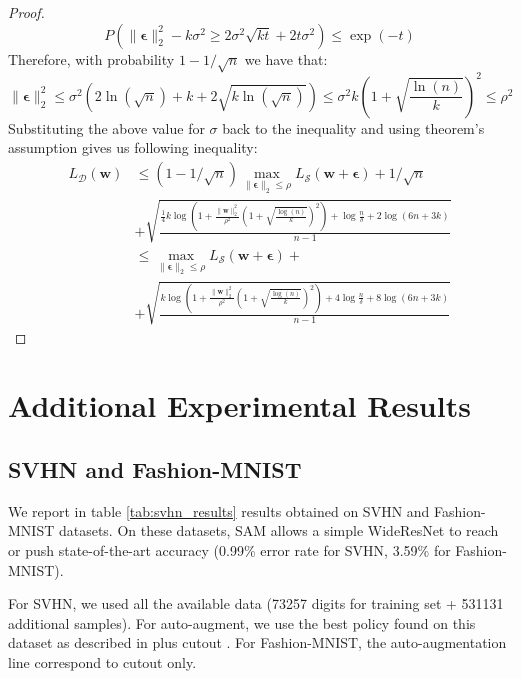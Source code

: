\documentclass{article} %
\begin{document}
\begin{proof}
\begin{equation}
    P(\|\boldsymbol{\epsilon}\|_2^2 - k\sigma^2 \geq 2\sigma^2\sqrt{kt} + 2t\sigma^2) \leq \exp(-t)
\end{equation}
Therefore, with probability $1-1/\sqrt{n}$ we have that:
$$\|\boldsymbol{\epsilon}\|_2^2\leq \sigma^2(2\ln(\sqrt{n})+k + 2\sqrt{k\ln(\sqrt{n})}) \leq \sigma^2k\left(1+\sqrt{\frac{\ln(n)}{k}}\right)^2\leq \rho^2$$
Substituting the above value for $\sigma$ back to the inequality and using theorem's assumption gives us following inequality:
\begin{align*}
    L_\mathscr{D}(\boldsymbol{w}) &\leq (1-1/\sqrt{n})\max_{\|\boldsymbol{\epsilon}\|_2 \leq \rho} L_\mathcal{S}(\boldsymbol{w} + \boldsymbol{\epsilon}) + 1/\sqrt{n}\\
    &+\sqrt{\frac{\frac{1}{4}k\log\left(1+\frac{\|\boldsymbol{w}\|_2^2}{\rho^2}\left(1+\sqrt{\frac{\log(n)}{k}}\right)^2\right) + \log\frac{n}{\delta} + 2\log\left(6n + 3k\right)}{n-1}}\\
    &\leq \max_{\|\boldsymbol{\epsilon}\|_2 \leq \rho} L_\mathcal{S}(\boldsymbol{w} + \boldsymbol{\epsilon}) + \\
    &+\sqrt{\frac{k\log\left(1+\frac{\|\boldsymbol{w}\|_2^2}{\rho^2}\left(1+\sqrt{\frac{\log(n)}{k}}\right)^2\right) + 4\log\frac{n}{\delta} + 8\log\left(6n + 3k\right)}{n-1}}
\end{align*}

\end{proof}


\section{Additional Experimental Results}

\subsection{SVHN and Fashion-MNIST}
\label{appendix:svhn}

We report in table \ref{tab:svhn_results} results obtained on SVHN and Fashion-MNIST datasets.
On these datasets, SAM allows a simple WideResNet to reach or push state-of-the-art accuracy (0.99\% error rate for SVHN, 3.59\% for Fashion-MNIST).

For SVHN, we used all the available data (73257 digits for training set + 531131 additional samples). For auto-augment, we use the best policy found on this dataset as described in \citep{autoaug} plus cutout \citep{cutout}. For Fashion-MNIST, the auto-augmentation line correspond to cutout only.
\end{document}
